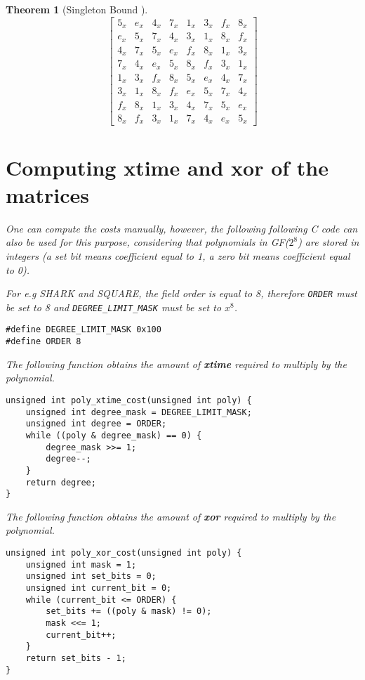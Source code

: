 \documentclass{report}
\newtheorem{theorem}{Theorem}{\bfseries}{\itshape}
\begin{document}
\begin{theorem}[Singleton Bound \cite{SloaneBook}]
\begin{equation}\label{mat:whirlwind-m1}
\begin{bmatrix}
5_x & e_x & 4_x & 7_x & 1_x & 3_x & f_x & 8_x\\
e_x & 5_x & 7_x & 4_x & 3_x & 1_x & 8_x & f_x\\
4_x & 7_x & 5_x & e_x & f_x & 8_x & 1_x & 3_x\\
7_x & 4_x & e_x & 5_x & 8_x & f_x & 3_x & 1_x\\
1_x & 3_x & f_x & 8_x & 5_x & e_x & 4_x & 7_x\\
3_x & 1_x & 8_x & f_x & e_x & 5_x & 7_x & 4_x\\
f_x & 8_x & 1_x & 3_x & 4_x & 7_x & 5_x & e_x\\
8_x & f_x & 3_x & 1_x & 7_x & 4_x & e_x & 5_x
\end{bmatrix}
\end{equation}

\section{Computing \textbf{xtime} and \textbf{xor} of the matrices}

One can compute the costs manually, however, the following following C code can also be used for this purpose, considering that polynomials in GF($2^8$) are stored in integers (a set bit means coefficient equal to 1, a zero bit means coefficient equal to 0).

For e.g SHARK and SQUARE, the field order is equal to 8, therefore \texttt{ORDER} must be set to 8 and \texttt{DEGREE_LIMIT_MASK} must be set to $x^8$.

\begin{verbatim}
#define DEGREE_LIMIT_MASK 0x100
#define ORDER 8
\end{verbatim}

The following function obtains the amount of \textbf{xtime} required to multiply by the polynomial.

\begin{verbatim}
unsigned int poly_xtime_cost(unsigned int poly) {
	unsigned int degree_mask = DEGREE_LIMIT_MASK;
	unsigned int degree = ORDER;
	while ((poly & degree_mask) == 0) {
		degree_mask >>= 1;
		degree--;
	}
	return degree;
}
\end{verbatim}

The following function obtains the amount of \textbf{xor} required to multiply by the polynomial.
\begin{verbatim}
unsigned int poly_xor_cost(unsigned int poly) {
	unsigned int mask = 1;
	unsigned int set_bits = 0;
	unsigned int current_bit = 0;
	while (current_bit <= ORDER) {
		set_bits += ((poly & mask) != 0);
		mask <<= 1;
		current_bit++;
	}
	return set_bits - 1;
}
\end{verbatim}


\end{theorem}
\end{document}
